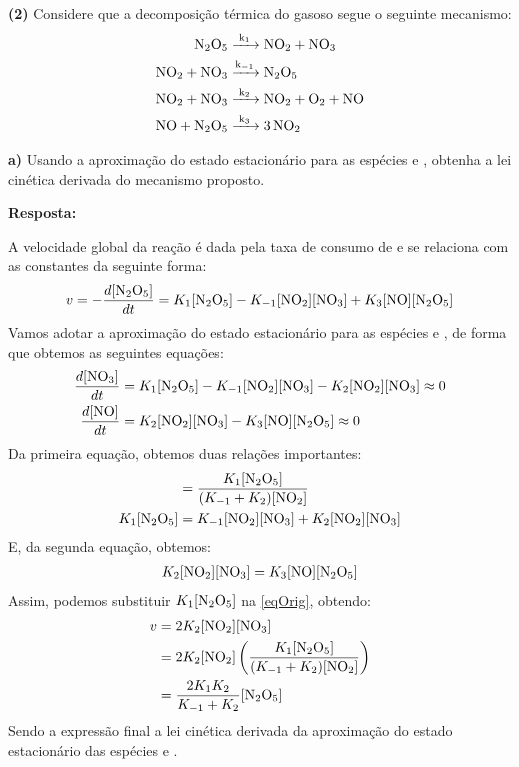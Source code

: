 \textbf{(2)} Considere que a decomposição térmica do  gasoso segue o seguinte mecanismo:
\begin{align*}
    \ce{N2O5 &->[{k_1}] NO2 + NO3}\\
    \ce{NO2 + NO3 &->[{k_{-1}}] N2O5}\\
    \ce{NO2 + NO3 &->[{k_2}] NO2 + O2 + NO}\\
    \ce{NO + N2O5 &->[{k_3}] 3NO2}
\end{align*}

\textbf{a)} Usando a aproximação do estado estacionário para as espécies  e , obtenha a lei cinética derivada do mecanismo proposto.

\textbf{Resposta:}

A velocidade global da reação é dada pela taxa de consumo de  e se relaciona com as constantes da seguinte forma:
\begin{align}\label{eqOrig}
    v = - \frac{d[\ce{N2O5}]}{dt} = K_1 [\ce{N2O5}] - K_{-1} [\ce{NO2}][\ce{NO3}] + K_3 [\ce{NO}][\ce{N2O5}]
\end{align}
Vamos adotar a aproximação do estado estacionário para as espécies  e , de forma que obtemos as seguintes equações:
\begin{align*}
    \frac{d[\ce{NO3}]}{dt} &= K_1 [\ce{N2O5}] - K_{-1} [\ce{NO2}][\ce{NO3}] - K_2 [\ce{NO2}][\ce{NO3}] \approx 0\\
    \frac{d[\ce{NO}]}{dt} &= K_2 [\ce{NO2}][\ce{NO3}] - K_3 [\ce{NO}][\ce{N2O5}] \approx 0
\end{align*}
Da primeira equação, obtemos duas relações importantes:
\begin{align*}
    [\ce{NO3}] &= \frac{K_1 [\ce{N2O5}]}{(K_{-1} + K_2) [\ce{NO2}]}\\
    K_1 [\ce{N2O5}] &= K_{-1} [\ce{NO2}][\ce{NO3}] + K_2 [\ce{NO2}][\ce{NO3}]
\end{align*}
E, da segunda equação, obtemos:
\begin{align*}
    K_2 [\ce{NO2}][\ce{NO3}] = K_3 [\ce{NO}][\ce{N2O5}]
\end{align*}
Assim, podemos substituir \( K_1 [\ce{N2O5}] \) na \cref{eqOrig}, obtendo:
\begin{align*}
    v &= 2 K_2 [\ce{NO2}][\ce{NO3}]\\
      &= 2 K_2 [\ce{NO2}] \left( \frac{K_1 [\ce{N2O5}]}{(K_{-1} + K_2) [\ce{NO2}]}  \right) \\
      &= \frac{2 K_1 K_2}{K_{-1} + K_2} [\ce{N2O5}]
\end{align*}
Sendo a expressão final a lei cinética derivada da aproximação do estado estacionário das espécies  e .

